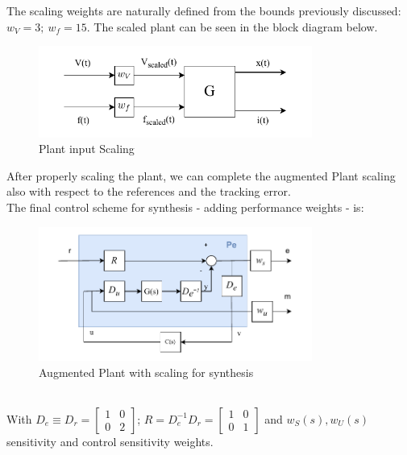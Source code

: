 \documentclass[a4paper, 12pt]{article}
\def\FigureSeven{\centering\includegraphics[width=0.8\textwidth]{Figures/fig07.pdf}}
\def\FigureAugmented{\centering\includegraphics[width=0.8\textwidth]{Figures/2I2Oc.pdf}}
\begin{document}
The scaling weights are naturally defined from the bounds previously discussed: $w_V = 3;\ w_f = 15$. The scaled plant can be seen in the block diagram below.
\begin{figure}[h!]
    \FigureSeven
    \caption{Plant input Scaling}
    \label{fig:fig07}
\end{figure}
After properly scaling the plant, we can complete the augmented Plant scaling also with respect to the references and the tracking error.
\\The final control scheme for synthesis - adding performance weights - is:
\begin{figure}[h!]
    \FigureAugmented
    \caption*{Augmented Plant with scaling for synthesis}
    \label{fig:aug_plant}
\end{figure}
\\With $D_e \equiv D_r = \begin{bmatrix}
1 & 0 \\
0 & 2
\end{bmatrix}$; $R =  D_e^{-1}D_r = \begin{bmatrix}
1 & 0 \\
0 & 1
\end{bmatrix}$ and $w_S(s), w_U(s)$ sensitivity and control sensitivity weights.
\end{document}
